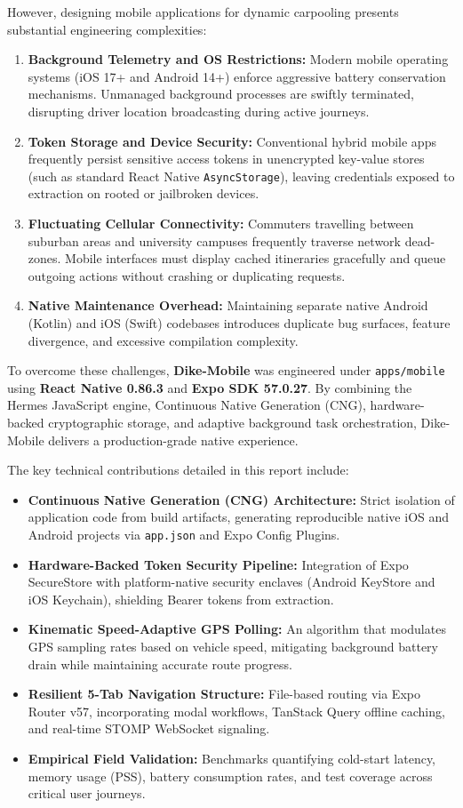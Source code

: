 \documentclass[conference,10pt,a4paper]{IEEEtran}
\begin{document}
However, designing mobile applications for dynamic carpooling presents substantial engineering complexities:
\begin{enumerate}
    \item \textbf{Background Telemetry and OS Restrictions:} Modern mobile operating systems (iOS 17+ and Android 14+) enforce aggressive battery conservation mechanisms. Unmanaged background processes are swiftly terminated, disrupting driver location broadcasting during active journeys.
    \item \textbf{Token Storage and Device Security:} Conventional hybrid mobile apps frequently persist sensitive access tokens in unencrypted key-value stores (such as standard React Native \texttt{AsyncStorage}), leaving credentials exposed to extraction on rooted or jailbroken devices.
    \item \textbf{Fluctuating Cellular Connectivity:} Commuters travelling between suburban areas and university campuses frequently traverse network dead-zones. Mobile interfaces must display cached itineraries gracefully and queue outgoing actions without crashing or duplicating requests.
    \item \textbf{Native Maintenance Overhead:} Maintaining separate native Android (Kotlin) and iOS (Swift) codebases introduces duplicate bug surfaces, feature divergence, and excessive compilation complexity.
\end{enumerate}

To overcome these challenges, \textbf{Dike-Mobile} was engineered under \texttt{apps/mobile} using \textbf{React Native 0.86.3} and \textbf{Expo SDK 57.0.27}. By combining the Hermes JavaScript engine, Continuous Native Generation (CNG), hardware-backed cryptographic storage, and adaptive background task orchestration, Dike-Mobile delivers a production-grade native experience.

The key technical contributions detailed in this report include:
\begin{itemize}
    \item \textbf{Continuous Native Generation (CNG) Architecture:} Strict isolation of application code from build artifacts, generating reproducible native iOS and Android projects via \texttt{app.json} and Expo Config Plugins.
    \item \textbf{Hardware-Backed Token Security Pipeline:} Integration of Expo SecureStore with platform-native security enclaves (Android KeyStore and iOS Keychain), shielding Bearer tokens from extraction.
    \item \textbf{Kinematic Speed-Adaptive GPS Polling:} An algorithm that modulates GPS sampling rates based on vehicle speed, mitigating background battery drain while maintaining accurate route progress.
    \item \textbf{Resilient 5-Tab Navigation Structure:} File-based routing via Expo Router v57, incorporating modal workflows, TanStack Query offline caching, and real-time STOMP WebSocket signaling.
    \item \textbf{Empirical Field Validation:} Benchmarks quantifying cold-start latency, memory usage (PSS), battery consumption rates, and test coverage across critical user journeys.
\end{itemize}
\end{document}
